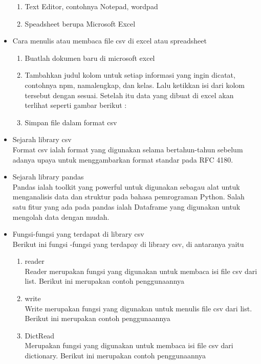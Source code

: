 \begin{itemize}
\begin{enumerate}
    \item Text Editor, contohnya Notepad, wordpad
    \item Speadsheet berupa Microsoft Excel
\end{enumerate}
\item Cara menulis atau membaca file csv di excel atau spreadsheet
\begin{enumerate}
    \item Buatlah dokumen baru di microsoft excel
    \item Tambahkan judul kolom untuk setiap informasi yang ingin dicatat, contohnya npm, namalengkap, dan kelas. Lalu ketikkan isi dari kolom tersebut dengan sesuai. Setelah itu data yang dibuat di excel akan terlihat seperti gambar berikut :\\
    \item Simpan file dalam format csv
\end{enumerate}
\item Sejarah library csv\\
Format csv ialah format yang digunakan selama bertahun-tahun sebelum adanya upaya untuk menggambarkan format standar pada RFC 4180.
\item Sejarah library pandas\\
Pandas ialah toolkit yang powerful untuk digunakan sebagau alat untuk menganalisis data dan struktur pada bahasa pemrograman Python. Salah satu fitur yang ada pada pandas ialah Dataframe yang digunakan untuk mengolah data dengan mudah.
\item Fungsi-fungsi yang terdapat di library csv\\
Berikut ini fungsi -fungsi yang terdapay di library csv, di antaranya yaitu
\begin{enumerate}
\item reader\\
Reader merupakan fungsi yang digunakan untuk membaca isi file csv dari list. Berikut ini merupakan contoh penggunaannya

\item write\\
Write merupakan fungsi yang digunakan untuk menulis file csv dari list. Berikut ini merupakan contoh penggunaannya

\item DictRead\\
Merupakan fungsi yang digunakan untuk membaca isi file csv dari dictionary. Berikut ini merupakan contoh penggunaannya


\end{enumerate}
\end{itemize}
